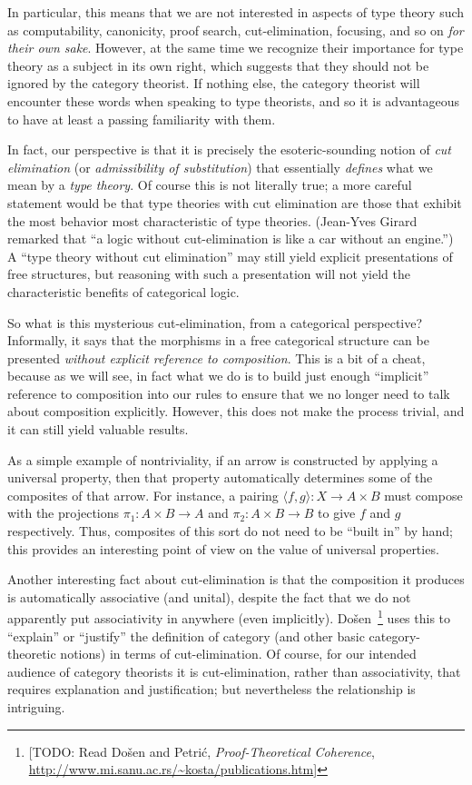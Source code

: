 \documentclass{book}
\def\pair#1#2{\langle #1,#2\rangle}
\begin{document}
In particular, this means that we are not interested in aspects of type theory such as computability, canonicity, proof search, cut-elimination, focusing, and so on \emph{for their own sake}.
However, at the same time we recognize their importance for type theory as a subject in its own right, which suggests that they should not be ignored by the category theorist.
If nothing else, the category theorist will encounter these words when speaking to type theorists, and so it is advantageous to have at least a passing familiarity with them.

In fact, our perspective is that it is precisely the esoteric-sounding notion of \emph{cut elimination} (or \emph{admissibility of substitution}) that essentially \emph{defines} what we mean by a \emph{type theory}.
Of course this is not literally true; a more careful statement would be that type theories with cut elimination are those that exhibit the most behavior most characteristic of type theories.
(Jean-Yves Girard remarked that ``a logic without cut-elimination is like a car without an engine.'')
A ``type theory without cut elimination'' may still yield explicit presentations of free structures, but reasoning with such a presentation will not yield the characteristic benefits of categorical logic.

So what is this mysterious cut-elimination, from a categorical perspective?
Informally, it says that the morphisms in a free categorical structure can be presented \emph{without explicit reference to composition}.
This is a bit of a cheat, because as we will see, in fact what we do is to build just enough ``implicit'' reference to composition into our rules to ensure that we no longer need to talk about composition explicitly.
However, this does not make the process trivial, and it can still yield valuable results.

As a simple example of nontriviality, if an arrow is constructed by applying a universal property, then that property automatically determines some of the composites of that arrow.
For instance, a pairing $\pair{f}{g}:X\to A\times B$ must compose with the projections $\pi_1:A\times B\to A$ and $\pi_2:A\times B\to B$ to give $f$ and $g$ respectively.
Thus, composites of this sort do not need to be ``built in'' by hand; this provides an interesting point of view on the value of universal properties.

Another interesting fact about cut-elimination is that the composition it produces is automatically associative (and unital), despite the fact that we do not apparently put associativity in anywhere (even implicitly).
Do\v{s}en~\cite{dosen:cutelim-cats}\footnote{[TODO: Read Do\v{s}en and Petri\'{c}, \textit{Proof-Theoretical Coherence}, \url{http://www.mi.sanu.ac.rs/~kosta/publications.htm}]} uses this to ``explain'' or ``justify'' the definition of category (and other basic category-theoretic notions) in terms of cut-elimination.
Of course, for our intended audience of category theorists it is cut-elimination, rather than associativity, that requires explanation and justification; but nevertheless the relationship is intriguing.
\end{document}

